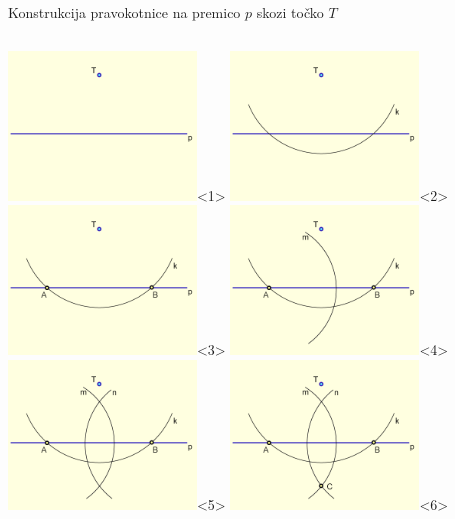 \begin{frame}{Konstrukcija pravokotnice na premico $p$ skozi točko $T$}
\begin{columns}
		  \includegraphics[width=50mm]{slike/fig-1.png}<1>
		  \includegraphics[width=50mm]{slike/fig-2.png}<2>
		  \includegraphics[width=50mm]{slike/fig-3.png}<3>
		  \includegraphics[width=50mm]{slike/fig-4.png}<4>
		  \includegraphics[width=50mm]{slike/fig-5.png}<5>
		  \includegraphics[width=50mm]{slike/fig-6.png}<6>

\end{columns}
\end{frame}
